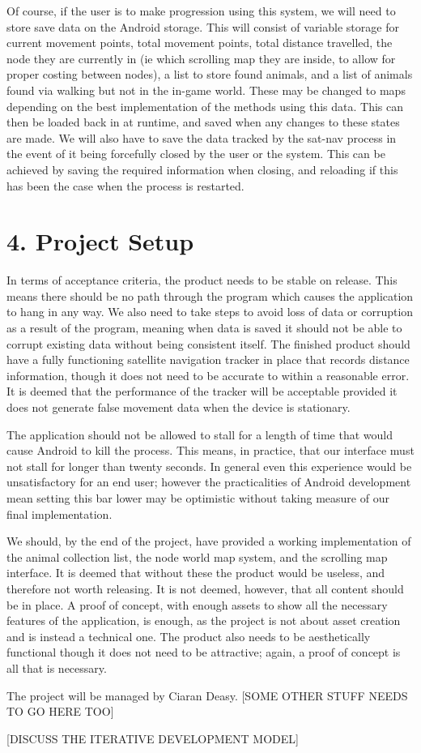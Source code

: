 \documentclass[]{report}
\begin{document}
Of course, if the user is to make progression using this system, we will need to store save data on the Android storage. This will consist of variable storage for current movement points, total movement points, total distance travelled, the node they are currently in (ie which scrolling map they are inside, to allow for proper costing between nodes), a list to store found animals, and a list of animals found via walking but not in the in-game world. These may be changed to maps depending on the best implementation of the methods using this data. This can then be loaded back in at runtime, and saved when any changes to these states are made. We will also have to save the data tracked by the sat-nav process in the event of it being forcefully closed by the user or the system. This can be achieved by saving the required information when closing, and reloading if this has been the case when the process is restarted.

\section*{4. Project Setup}

In terms of acceptance criteria, the product needs to be stable on release. This means there should be no path through the program which causes the application to hang in any way. We also need to take steps to avoid loss of data or corruption as a result of the program, meaning when data is saved it should not be able to corrupt existing data without being consistent itself. The finished product should have a fully functioning satellite navigation tracker in place that records distance information, though it does not need to be accurate to within a reasonable error. It is deemed that the performance of the tracker will be acceptable provided it does not generate false movement data when the device is stationary. 

The application should not be allowed to stall for a length of time that would cause Android to kill the process. This means, in practice, that our interface must not stall for longer than twenty seconds. In general even this experience would be unsatisfactory for an end user; however the practicalities of Android development mean setting this bar lower may be optimistic without taking measure of our final implementation.

We should, by the end of the project, have provided a working implementation of the animal collection list, the node world map system, and the scrolling map interface. It is deemed that without these the product would be useless, and therefore not worth releasing. It is not deemed, however, that all content should be in place. A proof of concept, with enough assets to show all the necessary features of the application, is enough, as the project is not about asset creation and is instead a technical one. The product also needs to be aesthetically functional though it does not need to be attractive; again, a proof of concept is all that is necessary.

The project will be managed by Ciaran Deasy. [SOME OTHER STUFF NEEDS TO GO HERE TOO]

[DISCUSS THE ITERATIVE DEVELOPMENT MODEL]
\end{document}

